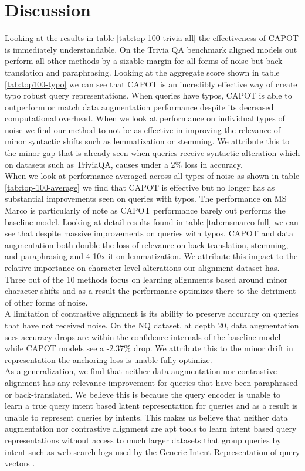 \section{Discussion}
Looking at the results in table \ref{tab:top-100-trivia-all} the effectiveness of CAPOT is immediately understandable. On the Trivia QA benchmark aligned models out perform all other methods by a sizable margin for all forms of noise but back translation and paraphrasing. Looking at the aggregate score shown in table \ref{tab:top100-typo} we can see that CAPOT is an incredibly effective way of create typo robust query representations. When queries have typos, CAPOT is able to outperform or match data augmentation performance despite its decreased computational overhead. When we look at performance on individual types of noise we find our method to not be as effective in improving the relevance of minor syntactic shifts such as lemmatization or stemming. We attribute this to the minor gap that is already seen when queries receive syntactic alteration which on datasets such as TriviaQA, causes under a 2\% loss in accuracy.\\
When we look at performance averaged across all types of noise as shown in table \ref{tab:top-100-average} we find that CAPOT is effective but no longer has as substantial improvements seen on queries with typos. The performance on MS Marco is particularly of note as CAPOT performance barely out performs the baseline model. Looking at detail results found in table \ref{tab:msmarco-full} we can see that despite massive improvements on queries with typos, CAPOT and data augmentation both double the loss of relevance on back-translation, stemming, and paraphrasing and 4-10x it on lemmatization. We attribute this impact to the relative importance on character level alterations our alignment dataset has. Three out of the 10 methods focus on learning alignments based around minor character shifts and as a result the performance optimizes there to the detriment of other forms of noise.   \\
A limitation of contrastive alignment is its ability to preserve accuracy on queries that have not received noise. On the NQ dataset, at depth 20, data augmentation sees accuracy drops are within the confidence internals of the baseline model while CAPOT models see a -2.37\% drop. We attribute this to the minor drift in representation the anchoring loss is unable fully optimize. \\
As a generalization, we find that neither data augmentation nor contrastive alignment has any relevance improvement for queries that have been paraphrased or back-translated. We believe this is because the query encoder is unable to learn a true query intent based latent representation for queries and as a result is unable to represent queries by intents. This makes us believe that neither data augmentation nor contrastive alignment are apt tools to learn intent based query representations without access to much larger datasets that group queries by intent such as web search logs used by the Generic Intent Representation of query vectors \cite{Zhang2019GenericIR}.\\
